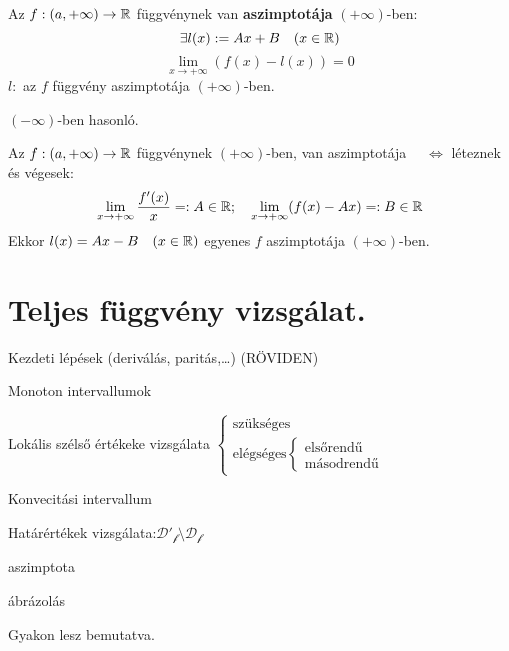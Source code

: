 \documentclass[a4paper,11.5pt]{article}
\begin{document}
	\begin{definition}
		Az $f:(a,+\infty)\to\mathbb{R}$ függvénynek van \textbf{aszimptotája} $(+\infty)$-ben:
		\[ \exists l(x):=Ax+B\quad (x\in\mathbb{R}) \]
		\[ \lim_{x\to+\infty}(f(x)-l(x))=0 \]
		$l:$ az $f$ függvény aszimptotája $(+\infty)$-ben.
	\end{definition}
	\begin{note}
		$(-\infty)$-ben hasonló.
	\end{note}
	\begin{theorem}
		Az $f:(a,+\infty)\to\mathbb{R}$ függvénynek $(+\infty)$-ben, van aszimptotája $\quad \Leftrightarrow$ léteznek és végesek:
		\[ \lim_{x\to+\infty}\frac{f'(x)}{x}=:A\in\mathbb{R};\quad \lim_{x\to+\infty}(f(x)-Ax)=:B\in\mathbb{R} \]
		Ekkor $l(x)=Ax-B\quad (x\in\mathbb{R})$ egyenes $f$ aszimptotája $(+\infty)$-ben.
	\end{theorem}
	\section{Teljes függvény vizsgálat.}
	\begin{compactenum}[1. {lépés}:]
		\item Kezdeti lépések (deriválás, paritás,\ldots) (RÖVIDEN)
		\item Monoton intervallumok
		\item Lokális szélső értékeke vizsgálata $\left.\begin{cases}
		\text{szükséges}\\
		\text{elégséges}\left\{\begin{gathered}
		\text{elsőrendű}\\
		\text{másodrendű}
		\end{gathered}\right.
		\end{cases}\right.$
		\item Konvecitási intervallum
		\item Határértékek vizsgálata:\quad $\mathcal{D'_f}\setminus\mathcal{D_f}$
		\item aszimptota
		\item ábrázolás
	\end{compactenum}
	\begin{note}
		Gyakon lesz bemutatva.
	\end{note}
\end{document}
